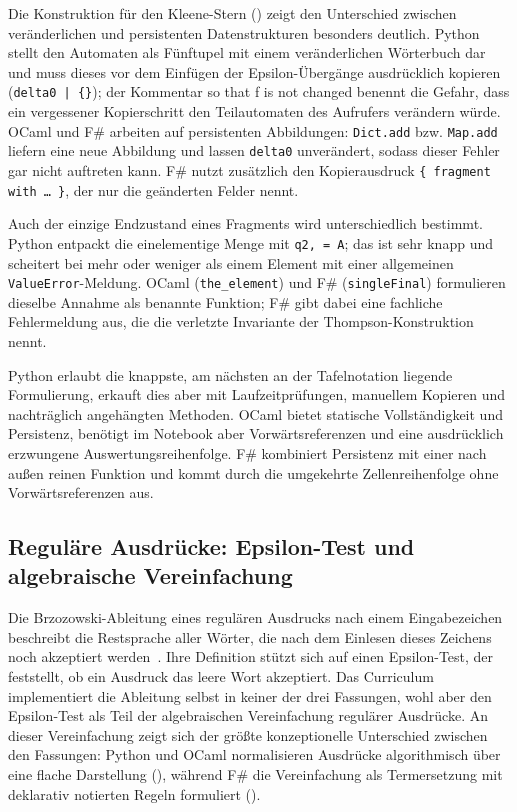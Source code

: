 Die Konstruktion für den Kleene-Stern () zeigt den Unterschied zwischen veränderlichen und persistenten Datenstrukturen besonders deutlich.
Python stellt den Automaten als Fünftupel mit einem veränderlichen Wörterbuch dar und muss dieses vor dem Einfügen der Epsilon-Übergänge ausdrücklich kopieren (\texttt{delta0 | \{\}}); der Kommentar \glqq so that f is not changed\grqq{} benennt die Gefahr, dass ein vergessener Kopierschritt den Teilautomaten des Aufrufers verändern würde.
OCaml und F\# arbeiten auf persistenten Abbildungen: \texttt{Dict.add} bzw. \texttt{Map.add} liefern eine neue Abbildung und lassen \texttt{delta0} unverändert, sodass dieser Fehler gar nicht auftreten kann.
F\# nutzt zusätzlich den Kopierausdruck \texttt{\{ fragment with \dots{} \}}, der nur die geänderten Felder nennt.

Auch der einzige Endzustand eines Fragments wird unterschiedlich bestimmt.
Python entpackt die einelementige Menge mit \texttt{q2, = A}; das ist sehr knapp und scheitert bei mehr oder weniger als einem Element mit einer allgemeinen \texttt{ValueError}-Meldung.
OCaml (\texttt{the\_element}) und F\# (\texttt{singleFinal}) formulieren dieselbe Annahme als benannte Funktion; F\# gibt dabei eine fachliche Fehlermeldung aus, die die verletzte Invariante der Thompson-Konstruktion nennt.

\begin{finding}
Python erlaubt die knappste, am nächsten an der Tafelnotation liegende Formulierung, erkauft dies aber mit Laufzeitprüfungen, manuellem Kopieren und nachträglich angehängten Methoden.
OCaml bietet statische Vollständigkeit und Persistenz, benötigt im Notebook aber Vorwärtsreferenzen und eine ausdrücklich erzwungene Auswertungsreihenfolge.
F\# kombiniert Persistenz mit einer nach außen reinen Funktion und kommt durch die umgekehrte Zellenreihenfolge ohne Vorwärtsreferenzen aus.
\end{finding}

\subsection{Reguläre Ausdrücke: Epsilon-Test und algebraische Vereinfachung}
\label{sec:case_simplify}
Die Brzozowski-Ableitung eines regulären Ausdrucks nach einem Eingabezeichen beschreibt die Restsprache aller Wörter, die nach dem Einlesen dieses Zeichens noch akzeptiert werden~\cite{brzozowski1964derivatives,owens2009regular}.
Ihre Definition stützt sich auf einen Epsilon-Test, der feststellt, ob ein Ausdruck das leere Wort akzeptiert.
Das Curriculum implementiert die Ableitung selbst in keiner der drei Fassungen, wohl aber den Epsilon-Test als Teil der algebraischen Vereinfachung regulärer Ausdrücke.
An dieser Vereinfachung zeigt sich der größte konzeptionelle Unterschied zwischen den Fassungen: Python und OCaml normalisieren Ausdrücke algorithmisch über eine flache Darstellung (), während F\# die Vereinfachung als Termersetzung mit deklarativ notierten Regeln formuliert ().

